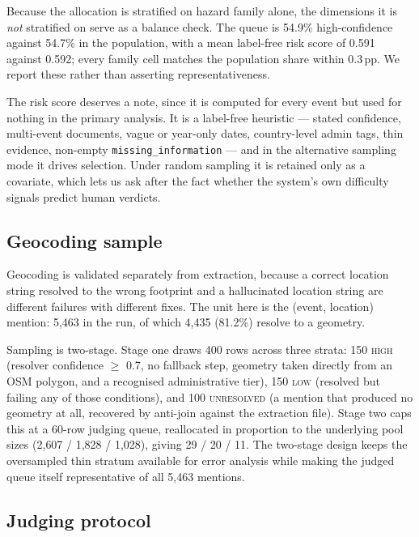 Because the allocation is stratified on hazard family alone, the dimensions it
is \emph{not} stratified on serve as a balance check. The queue is
54.9\% high-confidence against 54.7\% in the population, with a mean
label-free risk score of 0.591 against 0.592; every family cell matches the
population share within 0.3\,pp. We report these rather than asserting
representativeness.

The risk score deserves a note, since it is computed for every event but used
for nothing in the primary analysis. It is a label-free heuristic --- stated
confidence, multi-event documents, vague or year-only dates, country-level
admin tags, thin evidence, non-empty \texttt{missing\_information} --- and in
the alternative sampling mode it drives selection. Under random sampling it is
retained only as a covariate, which lets us ask after the fact whether the
system's own difficulty signals predict human verdicts.

\subsection{Geocoding sample}
\label{ssec:polygon-sample}

Geocoding is validated separately from extraction, because a correct location
string resolved to the wrong footprint and a hallucinated location string are
different failures with different fixes. The unit here is the (event,
location) mention: 5{,}463 in the run, of which 4{,}435 (81.2\%) resolve to a
geometry.

Sampling is two-stage. Stage one draws 400 rows across three strata: 150
\textsc{high} (resolver confidence $\geq$ 0.7, no fallback step, geometry taken
directly from an OSM polygon, and a recognised administrative tier), 150
\textsc{low} (resolved but failing any of those conditions), and 100
\textsc{unresolved} (a mention that produced no geometry at all, recovered by
anti-join against the extraction file). Stage two caps this at a 60-row judging
queue, reallocated in proportion to the underlying pool sizes
(2{,}607 / 1{,}828 / 1{,}028), giving 29 / 20 / 11. The two-stage design keeps
the oversampled thin stratum available for error analysis while making the
judged queue itself representative of all 5{,}463 mentions.

\subsection{Judging protocol}
\label{ssec:protocol}

